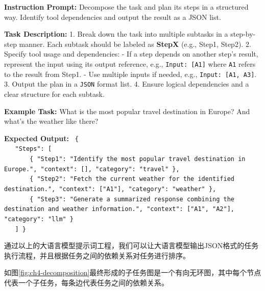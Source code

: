 \begin{center}
\begin{tcolorbox}[colback=bgcolor, colframe=black, width=0.85\textwidth, boxrule=0.5mm, 
coltitle=white, colbacktitle=titlecolor, title=Task Decomposition and Response Planning with GPT-4]


\textbf{Instruction Prompt:} Decompose the task and plan its steps in a structured way. Identify tool dependencies and output the result as a JSON list.

\textbf{Task Description:}  
1. Break down the task into multiple subtasks in a step-by-step manner. Each subtask should be labeled as \textbf{StepX} (e.g., Step1, Step2).  
2. Specify tool usage and dependencies:  
   - If a step depends on another step's result, represent the input using its output reference, e.g., \texttt{Input: [A1]} where \texttt{A1} refers to the result from Step1.  
   - Use multiple inputs if needed, e.g., \texttt{Input: [A1, A3]}.  
3. Output the plan in a \texttt{JSON} format list.  
4. Ensure logical dependencies and a clear structure for each subtask. 

\textbf{Example Task:}  
What is the most popular travel destination in Europe? And what’s the weather like there?

\textbf{Expected Output:}  
\texttt{%
\{ \\
\ \ \ "Steps": [ \\
\ \ \ \ \ \ \ \{ "Step1": "Identify the most popular travel destination in Europe.", "context": [], "category": "travel" \}, \\
\ \ \ \ \ \ \ \{ "Step2": "Fetch the current weather for the identified destination.", "context": ["A1"], "category": "weather" \}, \\
\ \ \ \ \ \ \ \{ "Step3": "Generate a summarized response combining the destination and weather information.", "context": ["A1", "A2"], "category": "llm" \} \\
\ \ \ ]
\}
}

\end{tcolorbox}
\end{center}

通过以上的大语言模型提示词工程，我们可以让大语言模型输出JSON格式的任务执行流程，并且根据任务之间的依赖关系对任务进行排序。

如图\ref{fig:ch4-decomposition}最终形成的子任务图是一个有向无环图，其中每个节点代表一个子任务，每条边代表任务之间的依赖关系。


